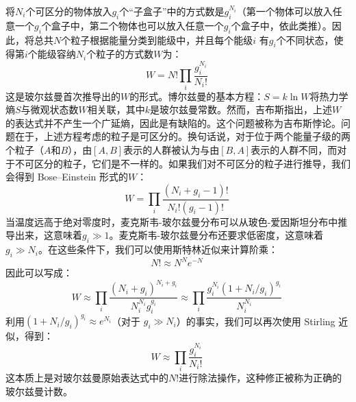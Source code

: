 将\(N_i\)个可区分的物体放入\(g_i\)个“子盒子”中的方式数是\(g_i^{N_i} \)（第一个物体可以放入任意一个\(g_i\)个盒子中，第二个物体也可以放入任意一个\(g_i\)个盒子中，依此类推）。因此，将总共\( N \)个粒子根据能量分类到能级中，并且每个能级\(i\) 有\( g_i\)个不同状态，使得第\(i\)个能级容纳\( N_i \)个粒子的方式数\(W\)为：
\[
W = N! \prod_{i} \frac{g_i^{N_i}}{N_i!}~
\]
这是玻尔兹曼首次推导出的\(W\)的形式。博尔兹曼的基本方程：\(S = k \ln W\)将热力学熵\( S \)与微观状态数\( W \)相关联，其中\( k \)是玻尔兹曼常数。然而，吉布斯指出，上述\( W \)的表达式并不产生一个广延熵，因此是有缺陷的。这个问题被称为吉布斯悖论。问题在于，上述方程考虑的粒子是可区分的。换句话说，对于位于两个能量子级的两个粒子（\(A\)和\(B\)），由\([A, B]\)表示的人群被认为与由\([B, A]\)表示的人群不同，而对于不可区分的粒子，它们是不一样的。如果我们对不可区分的粒子进行推导，我们会得到 Bose–Einstein 形式的\(W\)：
\[
W = \prod_{i} \frac{(N_i + g_i - 1)!}{N_i!(g_i - 1)!}~
\]
当温度远高于绝对零度时，麦克斯韦-玻尔兹曼分布可以从玻色-爱因斯坦分布中推导出来，这意味着\( g_i \gg 1 \)。麦克斯韦-玻尔兹曼分布还要求低密度，这意味着\( g_i \gg N_i \)。在这些条件下，我们可以使用斯特林近似来计算阶乘：
\[
N! \approx N^N e^{-N}~
\]
因此可以写成：
\[
W \approx \prod_{i} \frac{(N_i + g_i)^{N_i + g_i}}{N_i^{N_i} g_i^{g_i}} \approx \prod_{i} \frac{g_i^{N_i} (1 + N_i / g_i)^{g_i}}{N_i^{N_i}}~
\]
利用\( (1 + N_i / g_i)^{g_i} \approx e^{N_i} \)（对于 \( g_i \gg N_i \)）的事实，我们可以再次使用 Stirling 近似，得到：
\[
W \approx \prod_{i} \frac{g_i^{N_i}}{N_i!}~
\]
这本质上是对玻尔兹曼原始表达式中的\( N! \)进行除法操作，这种修正被称为正确的玻尔兹曼计数。

